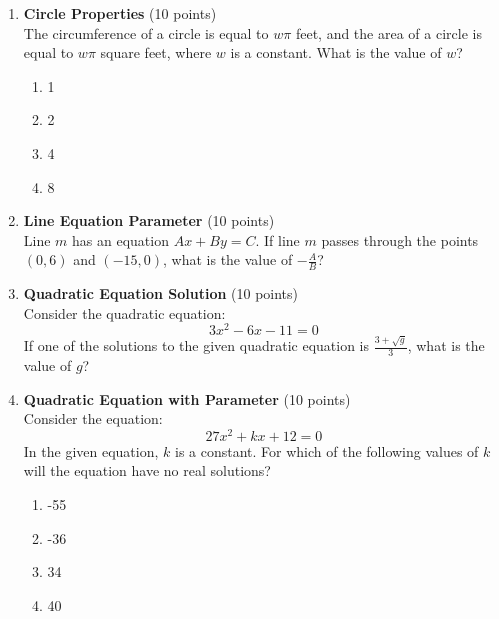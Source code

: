 \begin{enumerate}
  \item \textbf{Circle Properties} (10 points)\\
  The circumference of a circle is equal to $w \pi$ feet, and the area of a circle is equal to $w \pi$ square feet, where $w$ is a constant. What is the value of $w$?
  \begin{enumerate}[label=(\Alph*)]
    \item 1
    \item 2
    \item 4
    \item 8
  \end{enumerate}
  \begin{subanswer}
  \end{subanswer}



  \newpage

  \item \textbf{Line Equation Parameter} (10 points)\\
  Line $m$ has an equation $A x+B y=C$. If line $m$ passes through the points $(0,6)$ and $(-15,0)$, what is the value of $-\frac{A}{B}$?
  \begin{subanswer}
  \end{subanswer}

  \item \textbf{Quadratic Equation Solution} (10 points)\\
  Consider the quadratic equation:
  \[
    3 x^2-6 x-11=0
  \]
  If one of the solutions to the given quadratic equation is $\frac{3+\sqrt{g}}{3}$, what is the value of $g$?
  \begin{subanswer}
  \end{subanswer}

  \item \textbf{Quadratic Equation with Parameter} (10 points)\\
  Consider the equation:
  \[
    27 x^2+k x+12=0
  \]
  In the given equation, $k$ is a constant. For which of the following values of $k$ will the equation have no real solutions?
  \begin{enumerate}[label=(\Alph*)]
    \item -55
    \item -36
    \item 34
    \item 40
  \end{enumerate}
  \begin{subanswer}
  \end{subanswer}


\end{enumerate}
